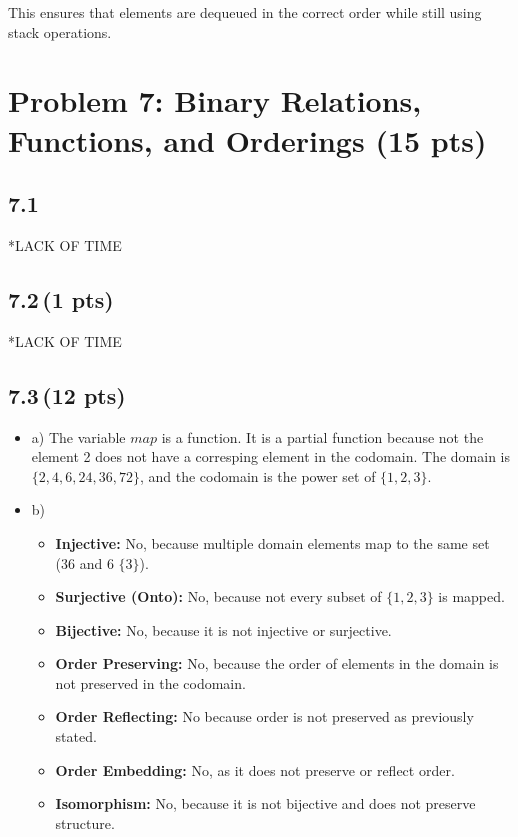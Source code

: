 \documentclass[12pt]{article}
\begin{document}
This ensures that elements are dequeued in the correct order while still using stack operations.


\newpage
\section*{Problem 7: Binary Relations, Functions, and Orderings (15 pts)}

\subsection*{7.1}
*LACK OF TIME


\subsection*{7.2\,(1 pts)}
*LACK OF TIME

\subsection*{7.3\,(12 pts)}
\begin{itemize}
    \item a) The variable \(map\) is a function. It is a partial function because not the element 2 does not have a corresping element in the codomain. The domain is \(\{2, 4, 6, 24, 36, 72\}\), and the codomain is the power set of \(\{1, 2, 3\}\).
    \item b) \begin{itemize}
       \item \textbf{Injective:} No, because multiple domain elements map to the same set (36 and 6 \(\{3\}\)).
       \item \textbf{Surjective (Onto):} No, because not every subset of \(\{1, 2, 3\}\) is mapped.
       \item \textbf{Bijective:} No, because it is not injective or surjective.
       \item \textbf{Order Preserving:} No, because the order of elements in the domain is not preserved in the codomain.
       \item \textbf{Order Reflecting:} No because order is not preserved as previously stated.
       \item \textbf{Order Embedding:} No, as it does not preserve or reflect order.
       \item \textbf{Isomorphism:} No, because it is not bijective and does not preserve structure.
\end{itemize}
\end{itemize}
\end{document}
